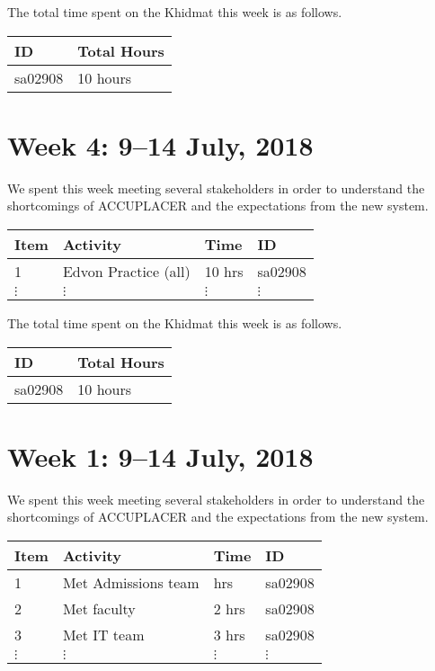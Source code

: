 \documentclass{article}
\begin{document}
The total time spent on the Khidmat this week is as follows.

\begin{tabular}{|l|l|}
  \hline
  ID & Total Hours\\\hline\hline
  sa02908 & 10 hours\\\hline
\end{tabular}


\newpage %
\section*{Week 4: 9--14 July, 2018}

We spent this week meeting several stakeholders in order to understand the shortcomings of ACCUPLACER and the expectations from the new system.

\begin{tabular}{|l|l|l|l|}
  \hline
  Item  & Activity & Time & ID \\\hline\hline
  1 & Edvon Practice (all) & 10 hrs & sa02908 \\\hline
  $\vdots$ & $\vdots$ & $\vdots$ & $\vdots$ \\\hline
\end{tabular}

The total time spent on the Khidmat this week is as follows.

\begin{tabular}{|l|l|}
  \hline
  ID & Total Hours\\\hline\hline
  sa02908 & 10 hours\\\hline
\end{tabular}


\newpage %
\section*{Week 1: 9--14 July, 2018}

We spent this week meeting several stakeholders in order to understand the shortcomings of ACCUPLACER and the expectations from the new system.

\begin{tabular}{|l|l|l|l|}
  \hline
  Item  & Activity & Time & ID \\\hline\hline
  1 & Met Admissions team & hrs & sa02908 \\\hline
  2 & Met faculty & 2 hrs & sa02908 \\\hline
  3 & Met IT team & 3 hrs & sa02908 \\\hline
  $\vdots$ & $\vdots$ & $\vdots$ & $\vdots$ \\\hline
\end{tabular}
\end{document}
